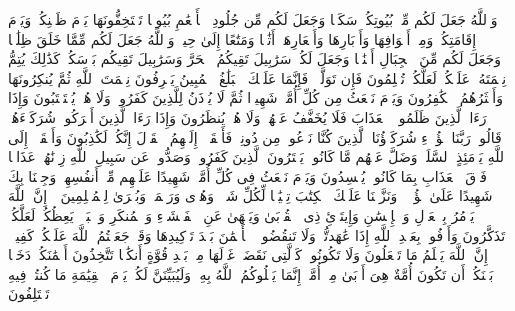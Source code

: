 \stopbuffer%
\startbuffer[\q:16:80]
وَٱللَّهُ جَعَلَ لَكُم مِّنۢ بُیُوتِكُمۡ سَكَنࣰا وَجَعَلَ لَكُم مِّن جُلُودِ ٱلۡأَنۡعَٰمِ بُیُوتࣰا تَسۡتَخِفُّونَهَا یَوۡمَ ظَعۡنِكُمۡ وَیَوۡمَ إِقَامَتِكُمۡ وَمِنۡ أَصۡوَافِهَا وَأَوۡبَارِهَا وَأَشۡعَارِهَاۤ أَثَٰثࣰا وَمَتَٰعًا إِلَىٰ حِینࣲ%
\stopbuffer%
\startbuffer[\q:16:81]
وَٱللَّهُ جَعَلَ لَكُم مِّمَّا خَلَقَ ظِلَٰلࣰا وَجَعَلَ لَكُم مِّنَ ٱلۡجِبَالِ أَكۡنَٰنࣰا وَجَعَلَ لَكُمۡ سَرَٰبِیلَ تَقِیكُمُ ٱلۡحَرَّ وَسَرَٰبِیلَ تَقِیكُم بَأۡسَكُمۡۚ كَذَٰلِكَ یُتِمُّ نِعۡمَتَهُۥ عَلَیۡكُمۡ لَعَلَّكُمۡ تُسۡلِمُونَ%
\stopbuffer%
\startbuffer[\q:16:82]
فَإِن تَوَلَّوۡا۟ فَإِنَّمَا عَلَیۡكَ ٱلۡبَلَٰغُ ٱلۡمُبِینُ%
\stopbuffer%
\startbuffer[\q:16:83]
یَعۡرِفُونَ نِعۡمَتَ ٱللَّهِ ثُمَّ یُنكِرُونَهَا وَأَكۡثَرُهُمُ ٱلۡكَٰفِرُونَ%
\stopbuffer%
\startbuffer[\q:16:84]
وَیَوۡمَ نَبۡعَثُ مِن كُلِّ أُمَّةࣲ شَهِیدࣰا ثُمَّ لَا یُؤۡذَنُ لِلَّذِینَ كَفَرُوا۟ وَلَا هُمۡ یُسۡتَعۡتَبُونَ%
\stopbuffer%
\startbuffer[\q:16:85]
وَإِذَا رَءَا ٱلَّذِینَ ظَلَمُوا۟ ٱلۡعَذَابَ فَلَا یُخَفَّفُ عَنۡهُمۡ وَلَا هُمۡ یُنظَرُونَ%
\stopbuffer%
\startbuffer[\q:16:86]
وَإِذَا رَءَا ٱلَّذِینَ أَشۡرَكُوا۟ شُرَكَاۤءَهُمۡ قَالُوا۟ رَبَّنَا هَٰۤؤُلَاۤءِ شُرَكَاۤؤُنَا ٱلَّذِینَ كُنَّا نَدۡعُوا۟ مِن دُونِكَۖ فَأَلۡقَوۡا۟ إِلَیۡهِمُ ٱلۡقَوۡلَ إِنَّكُمۡ لَكَٰذِبُونَ%
\stopbuffer%
\startbuffer[\q:16:87]
وَأَلۡقَوۡا۟ إِلَى ٱللَّهِ یَوۡمَئِذٍ ٱلسَّلَمَۖ وَضَلَّ عَنۡهُم مَّا كَانُوا۟ یَفۡتَرُونَ%
\stopbuffer%
\startbuffer[\q:16:88]
ٱلَّذِینَ كَفَرُوا۟ وَصَدُّوا۟ عَن سَبِیلِ ٱللَّهِ زِدۡنَٰهُمۡ عَذَابࣰا فَوۡقَ ٱلۡعَذَابِ بِمَا كَانُوا۟ یُفۡسِدُونَ%
\stopbuffer%
\startbuffer[\q:16:89]
وَیَوۡمَ نَبۡعَثُ فِی كُلِّ أُمَّةࣲ شَهِیدًا عَلَیۡهِم مِّنۡ أَنفُسِهِمۡۖ وَجِئۡنَا بِكَ شَهِیدًا عَلَىٰ هَٰۤؤُلَاۤءِۚ وَنَزَّلۡنَا عَلَیۡكَ ٱلۡكِتَٰبَ تِبۡیَٰنࣰا لِّكُلِّ شَیۡءࣲ وَهُدࣰى وَرَحۡمَةࣰ وَبُشۡرَىٰ لِلۡمُسۡلِمِینَ%
\stopbuffer%
\startbuffer[\q:16:90]
۞ إِنَّ ٱللَّهَ یَأۡمُرُ بِٱلۡعَدۡلِ وَٱلۡإِحۡسَٰنِ وَإِیتَاۤئِ ذِی ٱلۡقُرۡبَىٰ وَیَنۡهَىٰ عَنِ ٱلۡفَحۡشَاۤءِ وَٱلۡمُنكَرِ وَٱلۡبَغۡیِۚ یَعِظُكُمۡ لَعَلَّكُمۡ تَذَكَّرُونَ%
\stopbuffer%
\startbuffer[\q:16:91]
وَأَوۡفُوا۟ بِعَهۡدِ ٱللَّهِ إِذَا عَٰهَدتُّمۡ وَلَا تَنقُضُوا۟ ٱلۡأَیۡمَٰنَ بَعۡدَ تَوۡكِیدِهَا وَقَدۡ جَعَلۡتُمُ ٱللَّهَ عَلَیۡكُمۡ كَفِیلًاۚ إِنَّ ٱللَّهَ یَعۡلَمُ مَا تَفۡعَلُونَ%
\stopbuffer%
\startbuffer[\q:16:92]
وَلَا تَكُونُوا۟ كَٱلَّتِی نَقَضَتۡ غَزۡلَهَا مِنۢ بَعۡدِ قُوَّةٍ أَنكَٰثࣰا تَتَّخِذُونَ أَیۡمَٰنَكُمۡ دَخَلَۢا بَیۡنَكُمۡ أَن تَكُونَ أُمَّةٌ هِیَ أَرۡبَىٰ مِنۡ أُمَّةٍۚ إِنَّمَا یَبۡلُوكُمُ ٱللَّهُ بِهِۦۚ وَلَیُبَیِّنَنَّ لَكُمۡ یَوۡمَ ٱلۡقِیَٰمَةِ مَا كُنتُمۡ فِیهِ تَخۡتَلِفُونَ%
\stopbuffer%
\startbuffer[\q:16:93]
